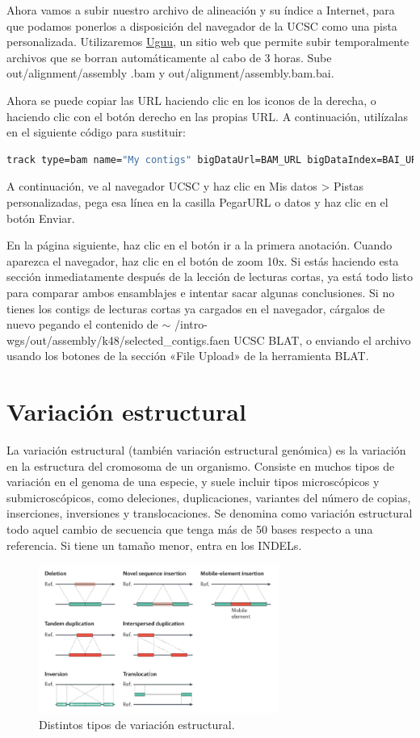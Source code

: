 Ahora vamos a subir nuestro archivo de alineación y su índice a Internet, para que podamos ponerlos a disposición del navegador de la UCSC como una pista personalizada.
Utilizaremos \href{https://uguu.se/}{Uguu}, un sitio web que permite subir temporalmente archivos que se borran automáticamente al cabo de 3 horas.
Sube out/alignment/assembly .bam y out/alignment/assembly.bam.bai. 

Ahora se puede copiar las URL haciendo clic en los iconos de la derecha, o haciendo clic con el botón derecho en las propias URL. A continuación, utilízalas en el siguiente código para sustituir:
\begin{lstlisting}[language=bash]
track type=bam name="My contigs" bigDataUrl=BAM_URL bigDataIndex=BAI_URL
\end{lstlisting}

A continuación, ve al navegador UCSC y haz clic en Mis datos > Pistas personalizadas, pega esa línea en la casilla PegarURL o datos y haz clic en el botón Enviar.

En la página siguiente, haz clic en el botón ir a la primera anotación. Cuando aparezca el navegador, haz clic en el botón de zoom 10x.
Si estás haciendo esta sección inmediatamente después de la lección de lecturas cortas, ya está todo listo para comparar ambos ensamblajes e intentar sacar algunas conclusiones.
Si no tienes los contigs de lecturas cortas ya cargados en el navegador, cárgalos de nuevo pegando el contenido de $\sim$ /intro-wgs/out/assembly/k48/selected\_contigs.faen UCSC BLAT, o enviando el archivo usando los botones de la sección «File Upload» de la herramienta BLAT.

\chapter{Variación estructural}
La variación estructural (también variación estructural genómica) es la variación en la estructura del cromosoma de un organismo. Consiste en muchos tipos de variación en el genoma de una especie, y suele incluir tipos microscópicos y submicroscópicos, como deleciones, duplicaciones, variantes del número de copias, inserciones, inversiones y translocaciones. Se denomina como variación estructural todo aquel cambio de secuencia que tenga más de 50 bases respecto a una referencia. Si tiene un tamaño menor, entra en los INDELs.

\begin{figure}[h!]
\centering
\includegraphics[width = 0.7\textwidth]{figs/types-sv.png}
\caption{Distintos tipos de variación estructural.}
\end{figure}

